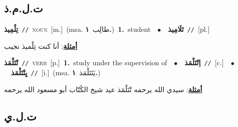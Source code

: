 \documentclass[10pt,a4paper,twoside]{article} %
\begin{document}
\begin{multicols}{2}
\vspace{-3mm}
\subsection*{\color{blue}\foreignlanguage{arabic}{ت.ل.م.ذ}\color{blue}{}} 

{\setlength\topsep{0pt}\textbf{\foreignlanguage{arabic}{تِلْمِيذ}}\ {\color{gray}\texttt{//}\color{black}}\ \textsc{noun}\ [m.]\ \color{gray}(msa. \foreignlanguage{arabic}{طالِب}~\foreignlanguage{arabic}{\textbf{١.}})\color{black}\ \textbf{1.}~student\ \ $\bullet$\ \ \setlength\topsep{0pt}\textbf{\foreignlanguage{arabic}{تَلَامِيذ}}\ {\color{gray}\texttt{//}\color{black}}\ [pl.]\  \begin{flushright}\color{gray}\foreignlanguage{arabic}{\textbf{\underline{\foreignlanguage{arabic}{أمثلة}}}: أنا كنت تِلْميذ نجيب}\end{flushright}\color{black}} \vspace{2mm}

{\setlength\topsep{0pt}\textbf{\foreignlanguage{arabic}{تْتَلْمَذ}}\ {\color{gray}\texttt{//}\color{black}}\ \textsc{verb}\ [p.]\ \textbf{1.}~study under the supervision of\ \ $\bullet$\ \ \setlength\topsep{0pt}\textbf{\foreignlanguage{arabic}{اِتْتَلْمَذ}}\ {\color{gray}\texttt{//}\color{black}}\ [c.]\ \ $\bullet$\ \ \setlength\topsep{0pt}\textbf{\foreignlanguage{arabic}{يِتْتَلْمَذ}}\ {\color{gray}\texttt{//}\color{black}}\ [i.]\ \color{gray}(msa. \foreignlanguage{arabic}{يَتَتَلْمَذ}~\foreignlanguage{arabic}{\textbf{١.}})\color{black}\  \begin{flushright}\color{gray}\foreignlanguage{arabic}{\textbf{\underline{\foreignlanguage{arabic}{أمثلة}}}: سيدي الله يرحمه تْتَلْمَذ عيد شيخ الكُتّاب أبو مسعود الله يرحمه}\end{flushright}\color{black}} \vspace{2mm}

\vspace{-3mm}
\subsection*{\color{blue}\foreignlanguage{arabic}{ت.ل.ي}\color{blue}{}} 


\end{multicols}
\end{document}

